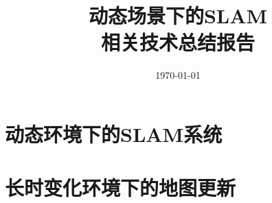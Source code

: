 \documentclass[11pt,a4paper,UTF8]{zhalabReport}
\title{\fontsize{40}{60}\selectfont 动态场景下的SLAM\\相关技术总结报告}
\date{\chdate\today}
\begin{document}

\maketitle

\tableofcontents


\chapter{动态环境下的SLAM系统}



\label{sec:slam}




\chapter{长时变化环境下的地图更新}
\label{sec:mapping}






	
\end{document}
